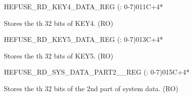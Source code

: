 \begin{register}{H}{EFUSE\_RD\_KEY4\_DATA\_REG (: 0-7)}{\hexprefix{}011C+4*}\label{regdesc:EFUSERDKEY4DATANREG}
%
\regnewline%
\begin{regdesc}\begin{reglist}
\label{fielddesc:EFUSEKEY4DATAN}\item [EFUSE\_KEY4\_DATA\regindex{n}] Stores the th 32 bits of KEY4. (RO)
\end{reglist}\end{regdesc}
\end{register}


\begin{register}{H}{EFUSE\_RD\_KEY5\_DATA\_REG (: 0-7)}{\hexprefix{}013C+4*}\label{regdesc:EFUSERDKEY5DATANREG}
%
\regnewline%
\begin{regdesc}\begin{reglist}
\label{fielddesc:EFUSEKEY5DATAN}\item [EFUSE\_KEY5\_DATA\regindex{n}] Stores the th 32 bits of KEY5. (RO)
\end{reglist}\end{regdesc}
\end{register}


\begin{register}{H}{EFUSE\_RD\_SYS\_DATA\_PART2\_\_REG (: 0-7)}{\hexprefix{}015C+4*}\label{regdesc:EFUSERDSYSDATAPART2NREG}
%
\regnewline%
\begin{regdesc}\begin{reglist}
\label{fielddesc:EFUSESYSDATAPART2N}\item [EFUSE\_SYS\_DATA\_PART2\_\regindex{n}] Stores the th 32 bits of the 2nd part of system data. (RO)
\end{reglist}\end{regdesc}
\end{register}


